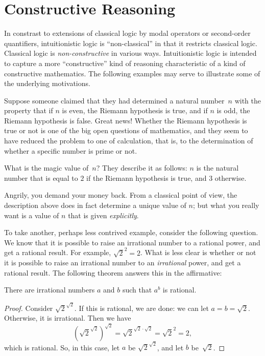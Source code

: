 \documentclass[../../../include/open-logic-chapter]{subfiles}
\begin{document}

\section{Constructive Reasoning}

In constrast to extensions of classical logic by modal operators or
second-order quantifiers, intuitionistic logic is ``non-classical'' in
that it restricts classical logic.  Classical logic is
\emph{non-constructive} in various ways. Intuitionistic logic is
intended to capture a more ``constructive'' kind of reasoning
characteristic of a kind of constructive mathematics. The following
examples may serve to illustrate some of the underlying motivations.

Suppose someone claimed that they had determined a natural number~$n$
with the property that if $n$ is even, the Riemann hypothesis is
true, and if $n$ is odd, the Riemann hypothesis is false. Great
news!{} Whether the Riemann hypothesis is true or not is one of the
big open questions of mathematics, and they seem to have reduced the
problem to one of calculation, that is, to the determination of
whether a specific number is prime or not.

What is the magic value of~$n$? They describe it as follows: $n$ is
the natural number that is equal to $2$ if the Riemann hypothesis is
true, and $3$ otherwise.

Angrily, you demand your money back. From a classical point of view,
the description above does in fact determine a unique value of $n$;
but what you really want is a value of $n$ that is given
\emph{explicitly}.

To take another, perhaps less contrived example, consider the
following question. We know that it is possible to raise an irrational
number to a rational power, and get a rational result. For example,
$\sqrt{2}^2 = 2$. What is less clear is whether or not it is possible
to raise an irrational number to an \emph{irrational} power, and get a
rational result. The following theorem answers this in the
affirmative:

\begin{thm}
There are irrational numbers $a$ and $b$ such that $a^b$ is rational.
\end{thm}

\begin{proof}
Consider $\sqrt{2}^{\sqrt{2}}$. If this is rational, we are done:
we can let $a = b = \sqrt{2}$. Otherwise, it is irrational. Then we
have
\[
(\sqrt{2}^{\sqrt{2}})^{\sqrt{2}} = \sqrt{2}^{\sqrt{2} \cdot
  \sqrt{2}} = \sqrt{2}^2 = 2,
\]
which is rational. So, in this case, let $a$ be
$\sqrt{2}^{\sqrt{2}}$, and let $b$ be~$\sqrt 2$.
\end{proof}
\end{document}
